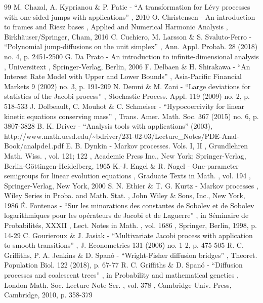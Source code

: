 \documentclass[11pt]{article}
\numberwithin{equation}{section}
\theoremstyle{plain}
\theoremstyle{definition}
\begin{document}
\begin{thebibliography}{99}
 M. Chazal, A. Kyprianou \& P. Patie - “A transformation for Lévy processes with one-sided jumps with applications” , 2010
 O. Christensen - An introduction to frames and Riesz bases , Applied and Numerical Harmonic Analysis , Birkhäuser/Springer, Cham, 2016
 C. Cuchiero, M. Larsson \& S. Svaluto-Ferro - “Polynomial jump-diffusions on the unit simplex” , Ann. Appl. Probab. 28 (2018) no. 4, p. 2451-2500
 G. Da Prato - An introduction to infinite-dimensional analysis , Universitext , Springer-Verlag, Berlin, 2006
 F. Delbaen \& H. Shirakawa - “An Interest Rate Model with Upper and Lower Bounds” , Asia-Pacific Financial Markets 9 (2002) no. 3, p. 191-209
 N. Demni \& M. Zani - “Large deviations for statistics of the Jacobi process” , Stochastic Process. Appl. 119 (2009) no. 2, p. 518-533
 J. Dolbeault, C. Mouhot \& C. Schmeiser - “Hypocoercivity for linear kinetic equations conserving mass” , Trans. Amer. Math. Soc. 367 (2015) no. 6, p. 3807-3828
 B. K. Driver - “Analysis tools with applications” (2003), http://www.math.ucsd.edu/\textasciitilde{}bdriver/231-02-03/Lecture\_Notes/PDE-Anal-Book/analpde1.pdf
 E. B. Dynkin - Markov processes. Vols. I, II , Grundlehren Math. Wiss. , vol. 121; 122 , Academic Press Inc., New York; Springer-Verlag, Berlin-Göttingen-Heidelberg, 1965
 K.-J. Engel \& R. Nagel - One-parameter semigroups for linear evolution equations , Graduate Texts in Math. , vol. 194 , Springer-Verlag, New York, 2000
 S. N. Ethier \& T. G. Kurtz - Markov processes , Wiley Series in Proba. and Math. Stat. , John Wiley \& Sons, Inc., New York, 1986
 É. Fontenas - “Sur les minorations des constantes de Sobolev et de Sobolev logarithmiques pour les opérateurs de Jacobi et de Laguerre” , in Séminaire de Probabilités, XXXII , Lect. Notes in Math. , vol. 1686 , Springer, Berlin, 1998, p. 14-29
 C. Gourieroux \& J. Jasiak - “Multivariate Jacobi process with application to smooth transitions” , J. Econometrics 131 (2006) no. 1-2, p. 475-505
 R. C. Griffiths, P. A. Jenkins \& D. Spanó - “Wright-Fisher diffusion bridges” , Theoret. Population Biol. 122 (2018), p. 67-77
 R. C. Griffiths \& D. Spanó - “Diffusion processes and coalescent trees” , in Probability and mathematical genetics , London Math. Soc. Lecture Note Ser. , vol. 378 , Cambridge Univ. Press, Cambridge, 2010, p. 358-379

\end{thebibliography}
\end{document}
